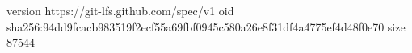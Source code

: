 version https://git-lfs.github.com/spec/v1
oid sha256:94dd9fcacb983519f2ecf55a69fbf0945c580a26e8f31df4a4775ef4d48f0e70
size 87544
